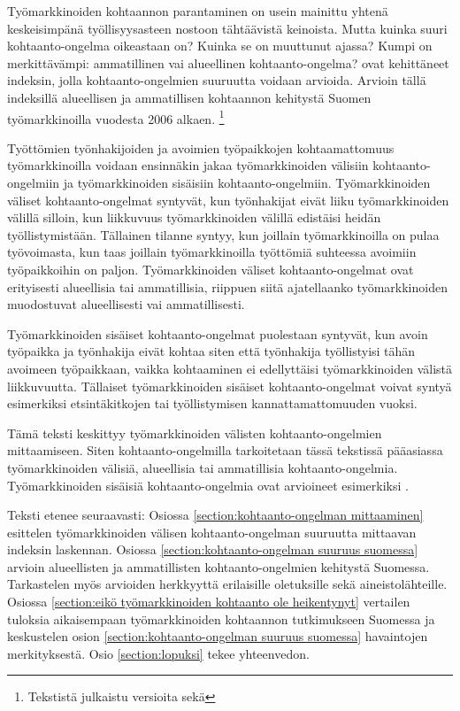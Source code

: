 \documentclass[12pt]{article}
\begin{document}
Työmarkkinoiden kohtaannon parantaminen on usein mainittu yhtenä keskeisimpänä työllisyysasteen nostoon tähtäävistä keinoista. Mutta kuinka suuri kohtaanto-ongelma oikeastaan on? Kuinka se on muuttunut ajassa? Kumpi on merkittävämpi: ammatillinen vai alueellinen kohtaanto-ongelma?  ovat kehittäneet indeksin, jolla kohtaanto-ongelmien suuruutta voidaan arvioida. Arvioin tällä indeksillä  alueellisen ja ammatillisen kohtaannon kehitystä Suomen työmarkkinoilla vuodesta 2006 alkaen. \footnote{Tekstistä julkaistu versioita  sekä }

Työttömien työnhakijoiden ja avoimien työpaikkojen kohtaamattomuus työmarkkinoilla voidaan ensinnäkin jakaa työmarkkinoiden välisiin kohtaanto-ongelmiin ja työmarkkinoiden sisäisiin kohtaanto-ongelmiin. Työmarkkinoiden väliset kohtaanto-ongelmat syntyvät, kun työnhakijat eivät liiku työmarkkinoiden välillä silloin, kun liikkuvuus työmarkkinoiden välillä edistäisi heidän työllistymistään. Tällainen tilanne syntyy, kun joillain työmarkkinoilla on pulaa työvoimasta, kun taas joillain työmarkkinoilla työttömiä suhteessa avoimiin työpaikkoihin on paljon. Työmarkkinoiden väliset kohtaanto-ongelmat ovat erityisesti alueellisia tai ammatillisia, riippuen siitä ajatellaanko työmarkkinoiden muodostuvat alueellisesti vai ammatillisesti.

Työmarkkinoiden sisäiset kohtaanto-ongelmat puolestaan syntyvät, kun avoin työpaikka ja työnhakija eivät kohtaa siten että työnhakija työllistyisi tähän avoimeen työpaikkaan, vaikka kohtaaminen ei edellyttäisi työmarkkinoiden välistä liikkuvuutta. Tällaiset työmarkkinoiden sisäiset kohtaanto-ongelmat voivat syntyä esimerkiksi etsintäkitkojen tai työllistymisen kannattamattomuuden vuoksi. 

Tämä teksti keskittyy työmarkkinoiden välisten kohtaanto-ongelmien mittaamiseen. Siten kohtaanto-ongelmilla tarkoitetaan tässä tekstissä pääasiassa työmarkkinoiden välisiä, alueellisia tai ammatillisia kohtaanto-ongelmia. Työmarkkinoiden sisäisiä kohtaanto-ongelmia ovat arvioineet esimerkiksi . 

Teksti etenee seuraavasti: Osiossa \ref{section:kohtaanto-ongelman mittaaminen} esittelen työmarkkinoiden välisen kohtaanto-ongelman suuruutta mittaavan indeksin laskennan. Osiossa \ref{section:kohtaanto-ongelman suuruus suomessa} arvioin alueellisten ja ammatillisten kohtaanto-ongelmien kehitystä Suomessa. Tarkastelen myös arvioiden herkkyyttä erilaisille oletuksille sekä aineistolähteille. Osiossa \ref{section:eikö työmarkkinoiden kohtaanto ole heikentynyt} vertailen tuloksia aikaisempaan työmarkkinoiden kohtaannon tutkimukseen Suomessa ja keskustelen osion \ref{section:kohtaanto-ongelman suuruus suomessa} havaintojen merkityksestä. Osio \ref{section:lopuksi} tekee yhteenvedon.
\end{document}
